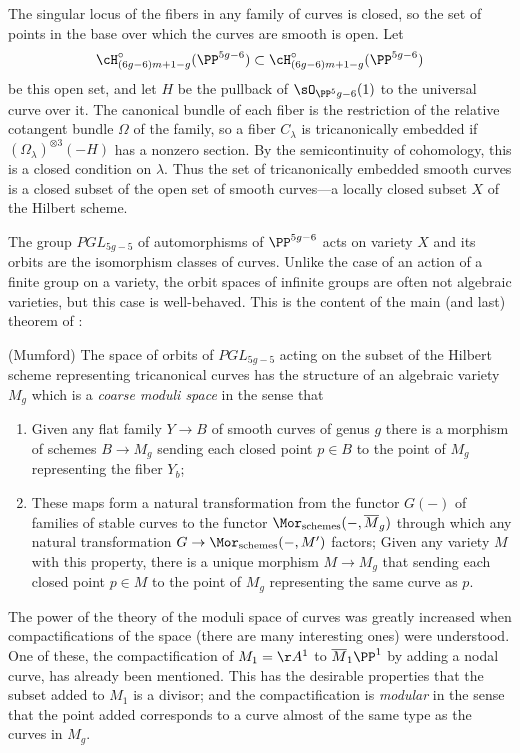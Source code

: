The singular locus of the fibers in any family of curves is closed, so the set of points in the base over which the curves are smooth is open.  Let 
$$
\cH^\circ_{(6g-6)m+1-g}(\PP^{5g-6}) \subset \cH^\circ_{(6g-6)m+1-g}(\PP^{5g-6})
$$
be this open set, and let $H$ be the pullback of $\sO_{\PP^5g-6}(1)$ to the universal curve over it.
The canonical bundle of each fiber is the restriction of the relative cotangent bundle $\Omega$ of the family,
so a fiber $C_\lambda$ is tricanonically embedded if $(\Omega_\lambda)^{\otimes 3}(-H)$ has a nonzero section. By the semicontinuity of cohomology, this is a closed condition on $\lambda.$  Thus
the set of tricanonically embedded smooth curves is a closed subset of the open set of smooth
curves---a locally closed subset $X$ of the Hilbert scheme.

The group $PGL_{5g-5}$ of automorphisms of $\PP^{5g-6}$ acts on variety $X$ and its orbits
are the isomorphism classes of curves. Unlike the case of an action of a finite group on a variety,
the orbit spaces of infinite groups are often not algebraic varieties, but this case is well-behaved. This is the content of the main (and last) theorem of \cite{GIT}:

\begin{theorem}(Mumford)
The space of orbits of $PGL_{5g-5}$ acting on the subset of the Hilbert scheme representing
tricanonical curves has the structure of an algebraic variety $M_g$ which is a \emph{coarse moduli
space} in the sense that
\begin{enumerate}
 \item Given any flat family $Y\to B$ of smooth curves of genus $g$ there is a morphism of schemes
 $B\to M_g$ sending each closed point $p\in B$ to the point of $M_g$ representing the fiber $Y_b$;
 \item These maps form a natural transformation from the functor $G(-)$ of families of stable curves to the functor 
 $\Mor_{\rm schemes}(-, \overline M_g)$ through which any natural transformation $G \to \Mor_{\rm schemes}(-, M')$
 factors;
Given any variety $M$ with this property, there is a unique morphism $M\to M_g$ that
 sending each closed point $p\in M$ to the point of $M_g$ representing the same curve as $p$.
 

\end{enumerate}
\end{theorem}

The power of the theory of the moduli space of curves was greatly increased when compactifications of the space (there are many interesting ones) were understood. One of these, the compactification
of $M_1 = \AA^1$ to $\overline M_1 \PP^1$ by adding a nodal curve, has already been mentioned. This has the desirable properties that the subset added to $M_1$ is a divisor; and the compactification is \emph{modular} in the sense
that the point added corresponds to a curve almost of the same type as the curves in $M_g$.

